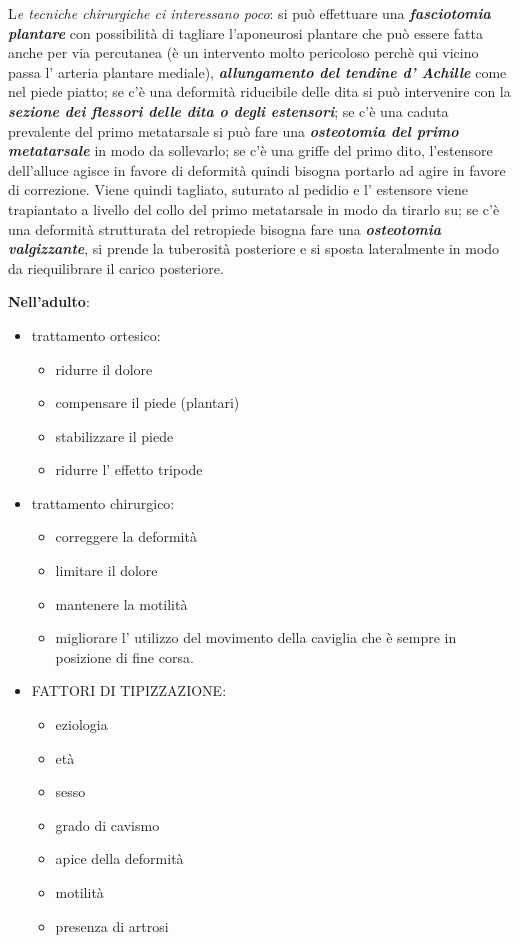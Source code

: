 L\emph{e tecniche chirurgiche ci interessano poco}: si può effettuare una \textbf{\emph{fasciotomia plantare}} con possibilità di tagliare l'aponeurosi plantare che può essere fatta anche per via percutanea (è un intervento molto pericoloso perchè qui vicino passa l' arteria plantare mediale), \textbf{\emph{allungamento del tendine d' Achille}} come nel piede piatto; se c'è una deformità riducibile delle dita si può intervenire con la \textbf{\emph{sezione dei flessori delle dita o degli estensori}}; se c'è una caduta prevalente del primo metatarsale si può fare una \textbf{\emph{osteotomia del primo metatarsale}} in modo da sollevarlo; se c'è una griffe del primo dito, l'estensore dell'alluce agisce in favore di deformità quindi bisogna portarlo ad agire in favore di correzione. Viene quindi tagliato, suturato al pedidio e l' estensore viene trapiantato a livello del collo del primo metatarsale in modo da tirarlo su; se c'è una deformità strutturata del retropiede bisogna fare una \textbf{\emph{osteotomia valgizzante}}, si prende la tuberosità posteriore e si sposta lateralmente in modo da riequilibrare il carico posteriore.

\textbf{Nell'adulto}:
\begin{itemize}
\item trattamento ortesico:
\begin{itemize}
\item
  ridurre il dolore
\item
  compensare il piede (plantari)
\item
  stabilizzare il piede
\item
  ridurre l' effetto tripode
\end{itemize}
\item trattamento chirurgico:
\begin{itemize}
\item
  correggere la deformità
\item
  limitare il dolore
\item
  mantenere la motilità
\item
  migliorare l' utilizzo del movimento della caviglia che è sempre in posizione di fine corsa.
\end{itemize}
\item FATTORI DI TIPIZZAZIONE:
\begin{itemize}
\item
  eziologia
\item
  età~
\item
  sesso~
\item
  grado di cavismo
\item
  apice della deformità
\item
  motilità
\item
  presenza di artrosi
\end{itemize}
\end{itemize}
